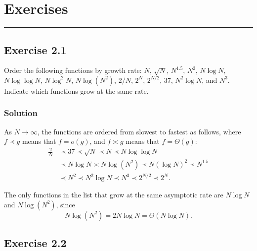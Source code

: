\documentclass[12pt,a4paper]{article}
\begin{document}
\null

\clearpage
{}
\pagecolor{white}
\color{black}
\pagestyle{plain}
\setcounter{page}{1}

\tableofcontents

\clearpage
{}
\setcounter{page}{1}

\section*{Exercises}
\noindent
{\color{accentgold}\rule{\linewidth}{0.7pt}}
\vspace{1.2em}

\subsection*{\color{sectionnavy}Exercise 2.1}

\noindent
Order the following functions by growth rate:
$N$, $\sqrt{N}$, $N^{1.5}$, $N^2$, $N\log N$,
$N\log\log N$, $N\log^2 N$, $N\log(N^2)$,
$2/N$, $2^N$, $2^{N/2}$, $37$, $N^2\log N$, and $N^3$.
Indicate which functions grow at the same rate.

\subsubsection*{\color{sectionnavy}Solution}

As $N\to\infty$, the functions are ordered from slowest to fastest as
follows, where $f\prec g$ means that $f=o(g)$, and $f\asymp g$ means that $f=\Theta(g)$:
\[
\begin{aligned}
\frac{2}{N}
&\prec 37
 \prec \sqrt{N}
 \prec N
 \prec N\log\log N \\
&\prec N\log N
 \asymp N\log(N^2)
 \prec N(\log N)^2
 \prec N^{1.5} \\
&\prec N^2
 \prec N^2\log N
 \prec N^3
 \prec 2^{N/2}
 \prec 2^N.
\end{aligned}
\]

The only functions in the list that grow at the same asymptotic rate are
$N\log N$ and $N\log(N^2)$, since
\[
N\log(N^2)=2N\log N=\Theta(N\log N).
\]

\subsection*{\color{sectionnavy}Exercise 2.2}
\end{document}
